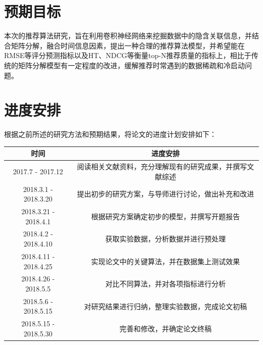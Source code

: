 \section{预期目标}

本次的推荐算法研究，旨在利用卷积神经网络来挖掘数据中的隐含关联信息，并结合矩阵分解，融合时间信息因素，提出一种合理的推荐算法模型，并希望能在RMSE等评分预测指标以及HT、NDCG等衡量top-N推荐质量的指标上，相比于传统的矩阵分解模型有一定程度的改进，缓解推荐时常遇到的数据稀疏和冷启动问题。
\section{进度安排} 
根据之前所述的研究方法和预期结果，将论文的进度计划安排如下：

\begin{table}[h]
\centering
\label{my-label}
\begin{tabular}{cc}
\hline
\rowcolor[HTML]{EFEFEF} 
\textbf{时间}           & \textbf{进度安排}                \\ \hline
2017.7 - 2017.12      & 阅读相关文献资料，充分理解现有的研究成果，并撰写文献综述 \\ \hline
2018.3.1 - 2018.3.20  & 提出初步的研究方案，与导师进行讨论，做出补充和改进    \\ \hline
2018.3.21 - 2018.4.1  & 根据研究方案确定初步的模型，并撰写开题报告                \\ \hline
2018.4.2 - 2018.4.10 & 获取实验数据，分析数据并进行预处理            \\ \hline
2018.4.11 - 2018.4.25 & 实现论文中的关键算法，并在数据集上测试效果        \\ \hline
2018.4.26 - 2018.5.5 & 对比不同算法，并对各项指标进行分析            \\ \hline
2018.5.6 - 2018.5.15 & 对研究结果进行归纳，整理实验数据，完成论文初稿      \\ \hline
2018.5.15 - 2018.5.30  & 完善和修改，并确定论文终稿                \\ \hline
\end{tabular}
\end{table}











